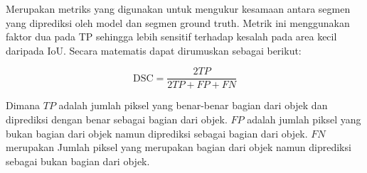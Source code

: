\noindent Merupakan metriks yang digunakan untuk mengukur kesamaan antara segmen yang diprediksi oleh model dan segmen ground truth\cite{jiang_iu-net_2023}. Metrik ini menggunakan faktor dua pada TP sehingga lebih sensitif terhadap kesalah pada area kecil daripada IoU. Secara matematis dapat dirumuskan sebagai berikut:

\begin{equation}
	\text{DSC} =  \frac{2TP}{2TP + FP + FN}
\end{equation}

\noindent Dimana \(TP\) adalah jumlah piksel yang benar-benar bagian dari objek dan diprediksi dengan benar sebagai bagian dari objek. \(FP\) adalah jumlah piksel yang bukan bagian dari objek namun diprediksi sebagai bagian dari objek. \(FN\) merupakan Jumlah piksel yang merupakan bagian dari objek namun diprediksi sebagai bukan bagian dari objek. 


